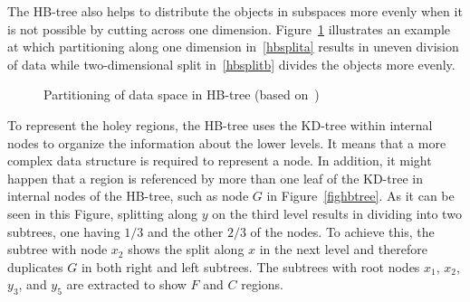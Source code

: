 \documentclass[a4paper,12pt]{article}
\begin{document}
The HB-tree also helps to distribute the objects in subspaces more evenly when it is not possible by cutting across one dimension. Figure~\ref{hbtree} illustrates an example at which partitioning along one dimension in~\ref{hbsplita} results in uneven division of data while two-dimensional split in~\ref{hbsplitb} divides the objects more evenly.

\begin{figure}
\centering
{}
\centering
{}
\caption{Partitioning of data space in HB-tree (based on~\cite{tree-basedindexes})}
\label{hbtree}
\end{figure}

To represent the holey regions, the HB-tree uses the KD-tree within internal nodes to organize the information about the lower levels. It means that a more complex data structure is required to represent a node. In addition, it might happen that a region is referenced by more than one leaf of the KD-tree in internal nodes of the HB-tree, such as node $G$ in Figure~\ref{fighbtree}. As it can be seen in this Figure, splitting along $y$ on the third level results in dividing into two subtrees, one having $1/3$ and the other $2/3$ of the nodes. To achieve this, the subtree with node $x_2$ shows the split along $x$ in the next level and therefore duplicates $G$ in both right and left subtrees. The subtrees with root nodes $x_1$, $x_2$, $y_3$, and $y_5$ are extracted to show $F$ and $C$ regions.
\end{document}
